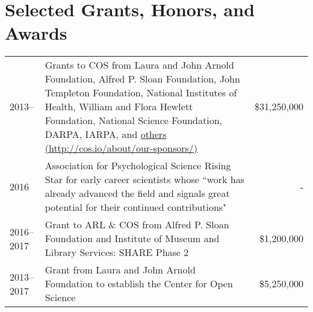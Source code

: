 \documentclass[11pt]{article}
\begin{document}
\section*{Selected Grants, Honors, and Awards}
\begin{tabularx}{\textwidth}{lXr}
2013-- 			& Grants to COS from Laura and John Arnold Foundation, Alfred P. Sloan Foundation, John Templeton Foundation, National Institutes of Health, William and Flora Hewlett Foundation, National Science Foundation, DARPA, IARPA, and \href{http://cos.io/about/our-sponsors/}{others (http://cos.io/about/our-sponsors/)} & \$31,250,000 \\
2016			& Association for Psychological Science Rising Star for early career scientists whose ``work has already advanced the field and signals great potential for their continued contributions" & - \\
2016--2017		& Grant to ARL \& COS from Alfred P. Sloan Foundation and Institute of Museum and Library Services: SHARE Phase 2 & \$1,200,000 \\
2013--2017  	& Grant from Laura and John Arnold Foundation to establish the Center for Open Science & \$5,250,000 \\
\end{tabularx}

\begin{publications}
\end{publications}
\end{document}
